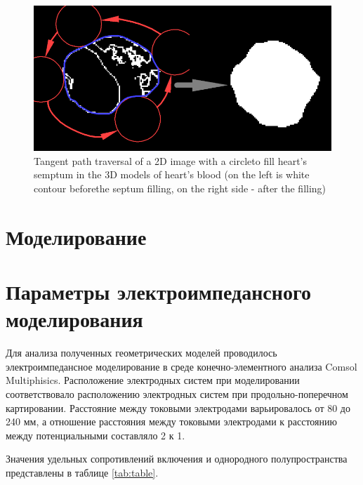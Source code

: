 \documentclass[conference]{IEEEtran}
\begin{document}
\begin{figure}[tbph]
    \centering
    \includegraphics[width=\linewidth]{fig/algo2}
    \caption{Tangent path traversal of a 2D image with a circleto fill heart's semptum
    in the 3D models of heart's blood (on the left is white contour beforethe septum filling,
        on the right side - after the filling)}
    \label{fig:algo2}
\end{figure}

\section{Моделирование}
\section{Параметры электроимпедансного моделирования}
Для анализа полученных геометрических моделей проводилось электроимпедансное моделирование в среде конечно-элементного анализа Comsol Multiphisics.
Расположение электродных систем при моделировании соответствовало расположению электродных систем при продольно-поперечном картировании. Расстояние между токовыми электродами варьировалось от 80 до 240 мм, а отношение расстояния между токовыми электродами к расстоянию между потенциальными составляло 2 к 1.

Значения удельных сопротивлений включения и однородного полупространства представлены в таблице \ref{tab:table}.
\end{document}
